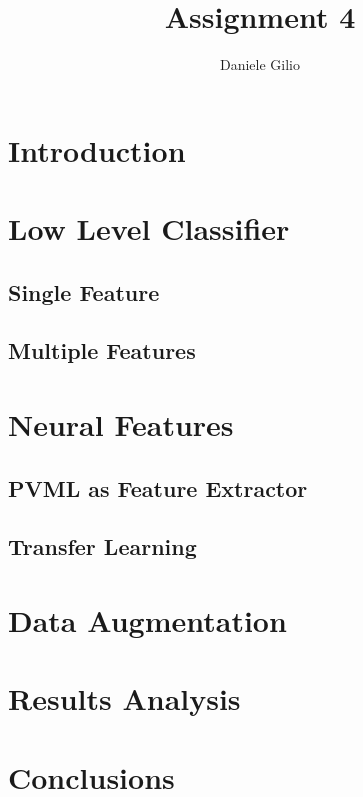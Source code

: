 \documentclass[10pt,a4paper]{report}
\author{Daniele Gilio}
\title{Assignment 4}
\begin{document}
\section{Introduction}
\section{Low Level Classifier}
\subsection{Single Feature}
\subsection{Multiple Features}
\section{Neural Features}
\subsection{PVML as Feature Extractor}
\subsection{Transfer Learning}
\section{Data Augmentation}
\section{Results Analysis}
\section{Conclusions}
\end{document}
